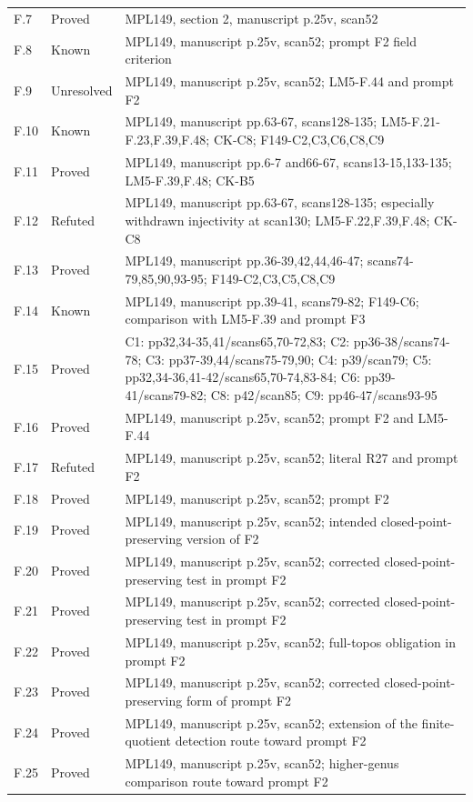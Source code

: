 {\begin{longtable}{p{1.9cm}p{1.7cm}p{10.3cm}}
F.7 & Proved & MPL149, section 2, manuscript p.25v, scan52 \\
F.8 & Known & MPL149, manuscript p.25v, scan52; prompt F2 field criterion \\
F.9 & Unresolved & MPL149, manuscript p.25v, scan52; LM5-F.44 and prompt F2 \\
F.10 & Known & MPL149, manuscript pp.63-67, scans128-135; LM5-F.21-F.23,F.39,F.48; CK-C8; F149-C2,C3,C6,C8,C9 \\
F.11 & Proved & MPL149, manuscript pp.6-7 and66-67, scans13-15,133-135; LM5-F.39,F.48; CK-B5 \\
F.12 & Refuted & MPL149, manuscript pp.63-67, scans128-135; especially withdrawn injectivity at scan130; LM5-F.22,F.39,F.48; CK-C8 \\
F.13 & Proved & MPL149, manuscript pp.36-39,42,44,46-47; scans74-79,85,90,93-95; F149-C2,C3,C5,C8,C9 \\
F.14 & Known & MPL149, manuscript pp.39-41, scans79-82; F149-C6; comparison with LM5-F.39 and prompt F3 \\
F.15 & Proved & C1: pp32,34-35,41/scans65,70-72,83; C2: pp36-38/scans74-78; C3: pp37-39,44/scans75-79,90; C4: p39/scan79; C5: pp32,34-36,41-42/scans65,70-74,83-84; C6: pp39-41/scans79-82; C8: p42/scan85; C9: pp46-47/scans93-95 \\
F.16 & Proved & MPL149, manuscript p.25v, scan52; prompt F2 and LM5-F.44 \\
F.17 & Refuted & MPL149, manuscript p.25v, scan52; literal R27 and prompt F2 \\
F.18 & Proved & MPL149, manuscript p.25v, scan52; prompt F2 \\
F.19 & Proved & MPL149, manuscript p.25v, scan52; intended closed-point-preserving version of F2 \\
F.20 & Proved & MPL149, manuscript p.25v, scan52; corrected closed-point-preserving test in prompt F2 \\
F.21 & Proved & MPL149, manuscript p.25v, scan52; corrected closed-point-preserving test in prompt F2 \\
F.22 & Proved & MPL149, manuscript p.25v, scan52; full-topos obligation in prompt F2 \\
F.23 & Proved & MPL149, manuscript p.25v, scan52; corrected closed-point-preserving form of prompt F2 \\
F.24 & Proved & MPL149, manuscript p.25v, scan52; extension of the finite-quotient detection route toward prompt F2 \\
F.25 & Proved & MPL149, manuscript p.25v, scan52; higher-genus comparison route toward prompt F2 \\

\end{longtable}}
